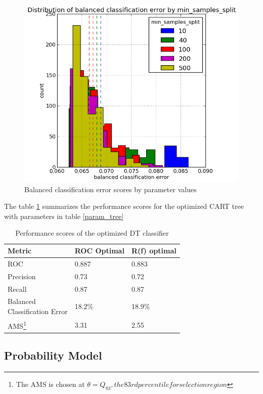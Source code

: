 \documentclass[final,3p,times,twocolumn]{elsarticle}
\begin{document}
\begin{figure}
\includegraphics[scale=0.5]{Images/balanced_classification_error_min_samples_split.png}
\caption{Balanced classification error scores by parameter values}
\label{param_iterate_bce}
\end{figure}

The table \ref{optimal_scores} summarizes the performance scores for the optimized CART tree with parameters in table \ref{param_tree}
 
\begin{table}
\centering
\begin{tabular}{l|l|l}
Metric & ROC Optimal & R(f) optimal \\
\toprule
ROC &  0.887 & 0.883\\
Precision & 0.73 & 0.72\\
Recall & 0.87 & 0.87\\
\pbox{10cm}{Balanced \\Classification Error} & 18.2\% & 18.9\%\\
AMS\footnote{The AMS is chosen at $\theta = Q_{83}, the 83rd percentile for selection region$ } & 3.31 & 2.55\\
\end{tabular}
\caption{Performance scores of the optimized DT classifier}
\label{optimal_scores}
\end{table}

\subsection{Probability Model}
\end{document}
